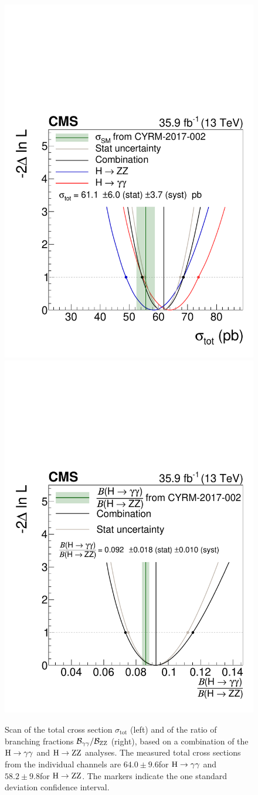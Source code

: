 \begin{figure}[hbtp]
  \begin{center}
    \includegraphics[width=0.49\linewidth]{img/differentials/scans_totalXS.pdf}
    \includegraphics[width=0.49\linewidth]{img/differentials/scans_ratioOfBRs.pdf}
    \caption{
        Scan of the total cross section $\sigma_\text{tot}$ (left) and of the ratio of branching fractions $\mathcal{B}_{\mathrm{\gamma}\mathrm{\gamma}}/\mathcal{B}_{\mathrm{Z}\mathrm{Z}}$ (right), based on a combination of the $\mathrm{H}\to\mathrm{\gamma}\mathrm{\gamma}$ and $\mathrm{H}\to\mathrm{Z}\mathrm{Z}$ analyses.
        The measured total cross sections from the individual channels are $64.0\pm9.6$\pb for $\mathrm{H}\to\mathrm{\gamma}\mathrm{\gamma}$ and $58.2\pm9.8$\pb for $\mathrm{H}\to\mathrm{Z}\mathrm{Z}$.
        The markers indicate the one standard deviation confidence interval.
        }
    \label{fig:RatioOfbrsAndTotalXSscan}
  \end{center}
\end{figure}


